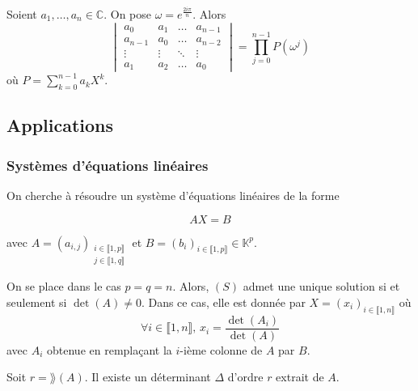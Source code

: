 	\begin{example}
		Soient $a_1, \dots, a_n \in \mathbb{C}$. On pose $\omega = e^{\frac{2i\pi}{n}}$. Alors
		\[ \begin{vmatrix} a_0 & a_1 & \dots & a_{n-1} \\ a_{n-1} & a_0 & \dots & a_{n-2}\\ \vdots & \vdots & \ddots & \vdots \\ a_1 & a_2 & \dots & a_0 \end{vmatrix} = \prod_{j=0}^{n-1} P(\omega^j) \]
		où $P = \sum_{k=0}^{n-1} a_k X^k$.
	\end{example}

	\subsection{Applications}

	\subsubsection{Systèmes d'équations linéaires}


	On cherche à résoudre un système d'équations linéaires de la forme

	\[ AX = B \tag{S} \]

	avec $A = (a_{i,j})_{\substack{i \in \llbracket 1, p \rrbracket \\ j \in \llbracket 1, q \rrbracket}}$ et $B = (b_i)_{i \in \llbracket 1, p \rrbracket} \in \mathbb{K}^p$.

	\begin{theorem}
		On se place dans le cas $p = q = n$. Alors, $(S)$ admet une unique solution si et seulement si $\det(A) \neq 0$. Dans ce cas, elle est donnée par $X = (x_i)_{i \in \llbracket 1, n \rrbracket}$ où
		\[ \forall i \in \llbracket 1, n \rrbracket, \, x_i = \frac{\det(A_i)}{\det(A)} \]
		avec $A_i$ obtenue en remplaçant la $i$-ième colonne de $A$ par $B$.
	\end{theorem}

	\begin{lemma}
		Soit $r = \rang(A)$. Il existe un déterminant $\Delta$ d'ordre $r$ extrait de $A$.
	\end{lemma}

